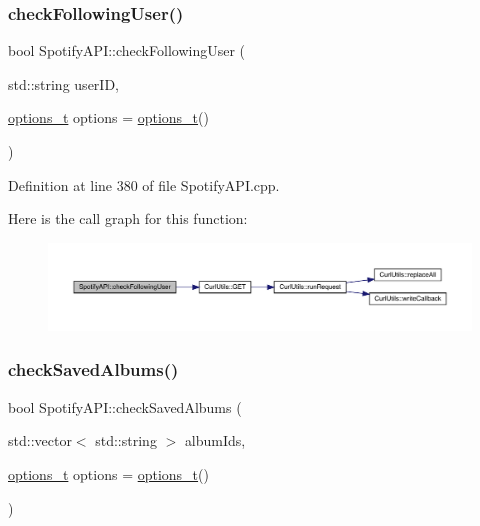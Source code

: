 \subsubsection{\texorpdfstring{check\+Following\+User()}{checkFollowingUser()}}
{\footnotesize\ttfamily bool Spotify\+A\+P\+I\+::check\+Following\+User (\begin{DoxyParamCaption}\item[{std\+::string}]{user\+ID,  }\item[{\mbox{\hyperlink{_spotify_a_p_i_8h_a0ff5cac1a4007bb330b7d9939650c283}{options\+\_\+t}}}]{options = {\ttfamily \mbox{\hyperlink{_spotify_a_p_i_8h_a0ff5cac1a4007bb330b7d9939650c283}{options\+\_\+t}}()} }\end{DoxyParamCaption})}



Definition at line 380 of file Spotify\+A\+P\+I.\+cpp.

Here is the call graph for this function\+:
\nopagebreak
\begin{figure}[H]
\begin{center}
\leavevmode
\includegraphics[width=350pt]{class_spotify_a_p_i_a05fc84c40326e8fed074dd640bc518fc_cgraph}
\end{center}
\end{figure}
\mbox{\label{class_spotify_a_p_i_a4a32dc278f53d67df8037b9a57b9d776}} 
\subsubsection{\texorpdfstring{check\+Saved\+Albums()}{checkSavedAlbums()}}
{\footnotesize\ttfamily bool Spotify\+A\+P\+I\+::check\+Saved\+Albums (\begin{DoxyParamCaption}\item[{std\+::vector$<$ std\+::string $>$}]{album\+Ids,  }\item[{\mbox{\hyperlink{_spotify_a_p_i_8h_a0ff5cac1a4007bb330b7d9939650c283}{options\+\_\+t}}}]{options = {\ttfamily \mbox{\hyperlink{_spotify_a_p_i_8h_a0ff5cac1a4007bb330b7d9939650c283}{options\+\_\+t}}()} }\end{DoxyParamCaption})}



